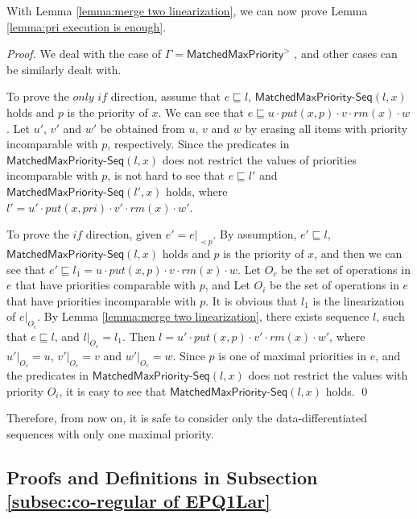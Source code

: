 With Lemma \ref{lemma:merge two linearization}, we can now prove Lemma \ref{lemma:pri execution is enough}.

\priExecutionIsEnough*
\begin {proof}

We deal with the case of $\Gamma = \mathsf{MatchedMaxPriority}^{>}$ , and other cases can be similarly dealt with.

To prove the $\textit{only if}$ direction, assume that $e \sqsubseteq l$, $\mathsf{MatchedMaxPriority\text{-}Seq}(l,x)$ holds and $p$ is the priority of $x$. We can see that $e \sqsubseteq u \cdot \textit{put}(x,p) \cdot v \cdot \textit{rm}(x) \cdot w$. Let $u'$, $v'$ and $w'$ be obtained from $u$, $v$ and $w$ by erasing all items with priority incomparable with $p$, respectively. Since the predicates in $\mathsf{MatchedMaxPriority\text{-}Seq}(l,x)$ does not restrict the values of priorities incomparable with $p$, is not hard to see that $e \sqsubseteq l'$ and $\mathsf{MatchedMaxPriority\text{-}Seq}(l',x)$ holds, where $l' = u' \cdot \textit{put}(x,\textit{pri}) \cdot v' \cdot \textit{rm}(x) \cdot w'$.

To prove the $\textit{if}$ direction, given $e' = e \vert_{\prec p}$. By assumption, $e' \sqsubseteq l$, $\mathsf{MatchedMaxPriority\text{-}Seq}(l,x)$ holds and $p$ is the priority of $x$, and then we can see that $e' \sqsubseteq l_1 = u \cdot \textit{put}(x,p) \cdot v \cdot \textit{rm}(x) \cdot w$. Let $O_c$ be the set of operations in $e$ that have priorities comparable with $p$, and Let $O_i$ be the set of operations in $e$ that have priorities incomparable with $p$. It is obvious that $l_1$ is the linearization of $e \vert_{O_c}$. By Lemma \ref{lemma:merge two linearization}, there exists sequence $l$, such that $e \sqsubseteq l$, and $l \vert_{O_c} = l_1$. Then $l = u' \cdot \textit{put}(x,p) \cdot v' \cdot \textit{rm}(x) \cdot w'$, where $u' \vert_{O_c} = u$, $v' \vert_{O_c} = v$ and $w' \vert_{O_c} = w$. Since $p$ is one of maximal priorities in $e$, and the predicates in $\mathsf{MatchedMaxPriority\text{-}Seq}(l,x)$ does not restrict the values with priority $O_i$, it is easy to see that $\mathsf{MatchedMaxPriority\text{-}Seq}(l,x)$ holds. \qed
\end {proof}

Therefore, from now on, it is safe to consider only the data-differentiated sequences with only one maximal priority. 





\subsection{Proofs and Definitions in Subsection \ref{subsec:co-regular of EPQ1Lar}}
\label{sec:appendix proof and definition in section co-regular of EPQ1Lar}


